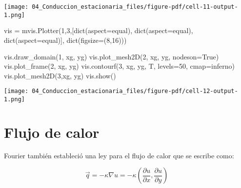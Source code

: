 \documentclass[
  letterpaper,
  DIV=11,
  numbers=noendperiod]{scrreprt}
\newenvironment{Shaded}{\begin{snugshade}}{\end{snugshade}}
\newcommand{\BuiltInTok}[1]{\textcolor[rgb]{0.00,0.23,0.31}{#1}}
\newcommand{\DecValTok}[1]{\textcolor[rgb]{0.68,0.00,0.00}{#1}}
\newcommand{\NormalTok}[1]{\textcolor[rgb]{0.00,0.23,0.31}{#1}}
\newcommand{\OperatorTok}[1]{\textcolor[rgb]{0.37,0.37,0.37}{#1}}
\newcommand{\StringTok}[1]{\textcolor[rgb]{0.13,0.47,0.30}{#1}}
\newcommand{\VariableTok}[1]{\textcolor[rgb]{0.07,0.07,0.07}{#1}}
\begin{document}
\texttt{[image: 04\_Conduccion\_estacionaria\_files/figure-pdf/cell-11-output-1.png]}

\begin{Shaded}
\begin{Highlighting}[]
\NormalTok{vis }\OperatorTok{=}\NormalTok{ mvis.Plotter(}\DecValTok{1}\NormalTok{,}\DecValTok{3}\NormalTok{,[}\BuiltInTok{dict}\NormalTok{(aspect}\OperatorTok{=}\StringTok{\textquotesingle{}equal\textquotesingle{}}\NormalTok{), }\BuiltInTok{dict}\NormalTok{(aspect}\OperatorTok{=}\StringTok{\textquotesingle{}equal\textquotesingle{}}\NormalTok{), }\BuiltInTok{dict}\NormalTok{(aspect}\OperatorTok{=}\StringTok{\textquotesingle{}equal\textquotesingle{}}\NormalTok{)],}
                  \BuiltInTok{dict}\NormalTok{(figsize}\OperatorTok{=}\NormalTok{(}\DecValTok{8}\NormalTok{,}\DecValTok{16}\NormalTok{)))}

\NormalTok{vis.draw\_domain(}\DecValTok{1}\NormalTok{, xg, yg)}
\NormalTok{vis.plot\_mesh2D(}\DecValTok{2}\NormalTok{, xg, yg, nodeson}\OperatorTok{=}\VariableTok{True}\NormalTok{)}
\NormalTok{vis.plot\_frame(}\DecValTok{2}\NormalTok{, xg, yg)}
\NormalTok{vis.contourf(}\DecValTok{3}\NormalTok{, xg, yg, T, levels}\OperatorTok{=}\DecValTok{50}\NormalTok{, cmap}\OperatorTok{=}\StringTok{\textquotesingle{}inferno\textquotesingle{}}\NormalTok{)}
\NormalTok{vis.plot\_mesh2D(}\DecValTok{3}\NormalTok{,xg, yg)}
\NormalTok{vis.show()}
\end{Highlighting}
\end{Shaded}

\texttt{[image: 04\_Conduccion\_estacionaria\_files/figure-pdf/cell-12-output-1.png]}

\section{Flujo de calor}\label{flujo-de-calor}

Fourier también estableció una ley para el flujo de calor que se escribe
como:

\[
\vec{q} = -\kappa \nabla u = -\kappa \left(\dfrac{\partial u}{\partial x}, \dfrac{\partial u}{\partial y}\right)
\]
\end{document}
